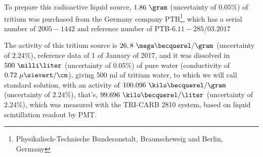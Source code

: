 To prepare this radioactive liquid source, $1.86~\gram$ (uncertainty of $0.05\%$) of tritium was purchased from the Germany company PTB\footnote{Physikalisch-Technische Bundesanstalt, Braunscheweig and Berlin, Germany}, which has a serial number of $2005-1442$ and reference number of PTB-$6.11-285/03.2017$ \cite{TritiumSourceTechnicalFile}


The activity of this tritium source is $26,8~\mega\becquerel/\gram$ (uncertainty of $2.24\%$), reference data of 1 of January of 2017, and it was dissolved in $500~\milli\liter$ (uncertainty of $0.05\%$) of pure water (conductivity of $0.72~\mu\sievert/\cm$), giving 500 ml of tritium water, to which we will call standard solution, with an activity of $100.096~\kilo\becquerel/\gram$ (uncertainty of $2.24\%$), that's, $99.696~\kilo\becquerel/\liter$ (uncertainty of $2.24\%$), which was measured with the TRI-CARB 2810 system, based on liquid scintillation readout by PMT.